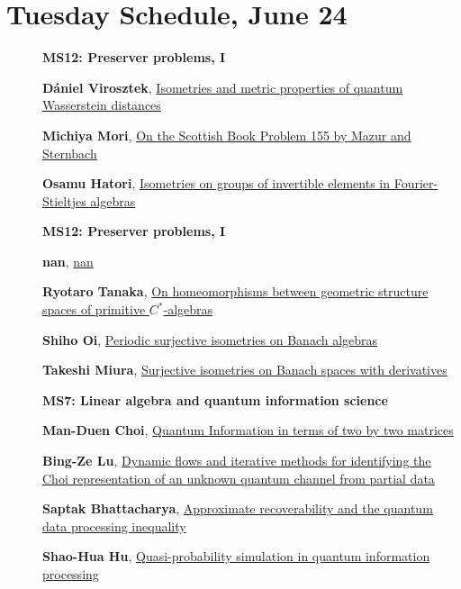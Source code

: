 \documentclass[ILAS2025-program.tex]{subfiles}
\begin{document}
\section*{Tuesday Schedule, June 24 }
        
        \begin{description}
    \item[] {\color{mstitle}\textbf{MS12: Preserver problems, I}} 
    \item[] \hypertarget{up0126}{}\textbf{Dániel Virosztek}, \hyperlink{down0126}{Isometries and metric properties of quantum Wasserstein distances}
        \item[] \hypertarget{up0127}{}\textbf{Michiya Mori}, \hyperlink{down0127}{On the Scottish Book Problem 155 by Mazur and Sternbach}
        \item[] \hypertarget{up0128}{}\textbf{Osamu Hatori}, \hyperlink{down0128}{Isometries on groups of invertible elements in Fourier-Stieltjes algebras}
        \end{description}
    \begin{description}
    \item[] {\color{mstitle}\textbf{MS12: Preserver problems, I}} 
    \item[] \hypertarget{up0161}{}\textbf{nan}, \hyperlink{down0161}{nan}
        \item[] \hypertarget{up0162}{}\textbf{Ryotaro Tanaka}, \hyperlink{down0162}{On homeomorphisms between geometric structure spaces of primitive $C^*$-algebras}
        \item[] \hypertarget{up0163}{}\textbf{Shiho Oi}, \hyperlink{down0163}{Periodic surjective isometries on Banach algebras}
        \item[] \hypertarget{up0164}{}\textbf{Takeshi Miura}, \hyperlink{down0164}{Surjective isometries on Banach spaces with derivatives}
        \end{description}
    \begin{description}
    \item[] {\color{mstitle}\textbf{MS7: Linear algebra and quantum information science}} 
    \item[] \hypertarget{up0205}{}\textbf{Man-Duen Choi}, \hyperlink{down0205}{Quantum Information in terms of two by two matrices}
        \item[] \hypertarget{up0206}{}\textbf{Bing-Ze Lu}, \hyperlink{down0206}{Dynamic flows and iterative methods for identifying the Choi representation of an unknown quantum channel from partial data
}
        \item[] \hypertarget{up0207}{}\textbf{Saptak Bhattacharya}, \hyperlink{down0207}{Approximate recoverability and the quantum data processing inequality}
        \item[] \hypertarget{up0208}{}\textbf{Shao-Hua Hu}, \hyperlink{down0208}{Quasi-probability simulation in quantum information processing}
        \end{description}
\end{document}
